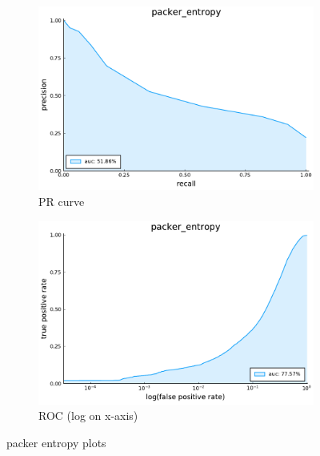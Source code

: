 \begin{figure}
    \centering
    \begin{subfigure}{.49\textwidth}
      \centering
      \includegraphics[width=1\linewidth]{pdfs/modperf/packer_entropy.bson-pr.pdf}
      \caption{PR curve}
    \end{subfigure}
    \begin{subfigure}{.49\textwidth}
        \centering
        \includegraphics[width=1\linewidth]{pdfs/modperf/packer_entropy.bson-roclog.pdf}
        \caption{ROC (log on x-axis)}
    \end{subfigure}
    \caption{packer entropy plots}
    \label{fig:fig}
\end{figure}


